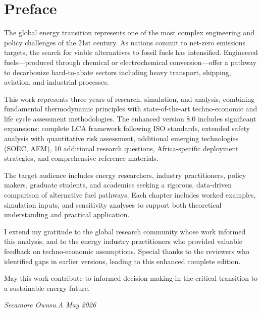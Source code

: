 \documentclass[12pt,twoside,openany]{book}
\begin{document}

\chapter*{Preface}

The global energy transition represents one of the most complex engineering and policy challenges of the 21st century. As nations commit to net-zero emissions targets, the search for viable alternatives to fossil fuels has intensified. Engineered fuels---produced through chemical or electrochemical conversion---offer a pathway to decarbonize hard-to-abate sectors including heavy transport, shipping, aviation, and industrial processes.

This work represents three years of research, simulation, and analysis, combining fundamental thermodynamic principles with state-of-the-art techno-economic and life cycle assessment methodologies. The enhanced version 8.0 includes significant expansions: complete LCA framework following ISO standards, extended safety analysis with quantitative risk assessment, additional emerging technologies (SOEC, AEM), 10 additional research questions, Africa-specific deployment strategies, and comprehensive reference materials.

The target audience includes energy researchers, industry practitioners, policy makers, graduate students, and academics seeking a rigorous, data-driven comparison of alternative fuel pathways. Each chapter includes worked examples, simulation inputs, and sensitivity analyses to support both theoretical understanding and practical application.

I extend my gratitude to the global research community whose work informed this analysis, and to the energy industry practitioners who provided valuable feedback on techno-economic assumptions. Special thanks to the reviewers who identified gaps in earlier versions, leading to this enhanced complete edition.

May this work contribute to informed decision-making in the critical transition to a sustainable energy future.

\textit{Secamore Owusu.A}
\textit{May 2026}

\end{document}
